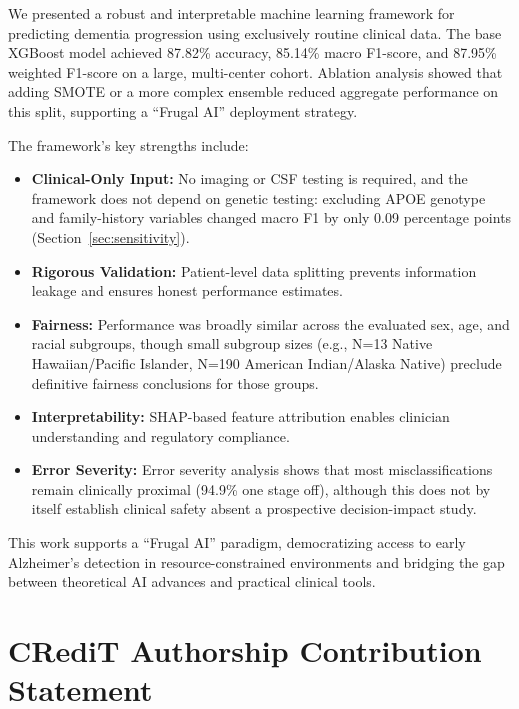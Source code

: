 \documentclass[preprint,12pt]{elsarticle}
\begin{document}
We presented a robust and interpretable machine learning framework for predicting dementia progression using exclusively routine clinical data. The base XGBoost model achieved 87.82\% accuracy, 85.14\% macro F1-score, and 87.95\% weighted F1-score on a large, multi-center cohort. Ablation analysis showed that adding SMOTE or a more complex ensemble reduced aggregate performance on this split, supporting a ``Frugal AI'' deployment strategy.

The framework's key strengths include:
\begin{itemize}
    \item \textbf{Clinical-Only Input:} No imaging or CSF testing is required, and the framework does not depend on genetic testing: excluding APOE genotype and family-history variables changed macro F1 by only 0.09 percentage points (Section~\ref{sec:sensitivity}).
    \item \textbf{Rigorous Validation:} Patient-level data splitting prevents information leakage and ensures honest performance estimates.
    \item \textbf{Fairness:} Performance was broadly similar across the evaluated sex, age, and racial subgroups, though small subgroup sizes (e.g., N=13 Native Hawaiian/Pacific Islander, N=190 American Indian/Alaska Native) preclude definitive fairness conclusions for those groups.
    \item \textbf{Interpretability:} SHAP-based feature attribution enables clinician understanding and regulatory compliance.
    \item \textbf{Error Severity:} Error severity analysis shows that most misclassifications remain clinically proximal (94.9\% one stage off), although this does not by itself establish clinical safety absent a prospective decision-impact study.
\end{itemize}

This work supports a ``Frugal AI'' paradigm, democratizing access to early Alzheimer's detection in resource-constrained environments and bridging the gap between theoretical AI advances and practical clinical tools.

\section*{CRediT Authorship Contribution Statement}
\end{document}
